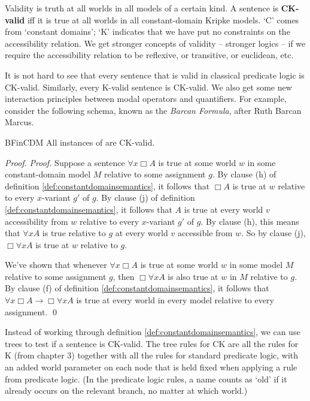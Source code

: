 Validity is truth at all worlds in all models of a certain kind. A sentence is
\textbf{CK-valid} iff it is true at all worlds in all constant-domain Kripke
models. `C' comes from `constant domains'; `K' indicates that we have put no
constraints on the accessibility relation. We get stronger concepts of validity
-- stronger logics -- if we require the accessibility relation to be reflexive,
or transitive, or euclidean, etc.

It is not hard to see that every sentence that is valid in classical predicate
logic is CK-valid. Similarly, every K-valid sentence is CK-valid. We also get
some new interaction principles between modal operators and quantifiers. For
example, consider the following schema, known as the \emph{Barcan Formula},
after Ruth Barcan Marcus.
%

\begin{observation}{BFinCDM}
  All instances of  are CK-valid.
\end{observation}
\begin{proof}
  \emph{Proof.} Suppose a sentence $\forall x \Box A$ is true at some world $w$
  in some constant-domain model $M$ relative to some assignment $g$. By clause
  (h) of definition \ref{def:constantdomainsemantics}, it follows that $\Box A$
  is true at $w$ relative to every $x$-variant $g'$ of $g$. By clause (j) of
  definition \ref{def:constantdomainsemantics}, it follows that $A$ is true at
  every world $v$ accessibility from $w$ relative to every $x$-variant $g'$ of
  $g$. By clause (h), this means that $\forall x A$ is true relative to $g$ at
  every world $v$ accessible from $w$. So by clause (j), $\Box \forall x A$ is
  true at $w$ relative to $g$.

  We've shown that whenever $\forall x \Box A$ is true at some world $w$ in some
  model $M$ relative to some assignment $g$, then $\Box \forall x A$ is also true
  at $w$ in $M$ relative to $g$. By clause (f) of definition
  \ref{def:constantdomainsemantics}, it follows that
  $\forall x \Box A \to\Box \forall x A$ is true at every world in every model
  relative to every assignment. \qed
\end{proof}

Instead of working through definition \ref{def:constantdomainsemantics}, we can
use trees to test if a sentence is CK-valid. The tree rules for CK are all the
rules for K (from chapter 3) together with all the rules for standard predicate
logic, with an added world parameter on each node that is held fixed when
applying a rule from predicate logic. (In the predicate logic rules, a
name counts as `old' if it already occurs on the relevant branch, no matter at which world.)

